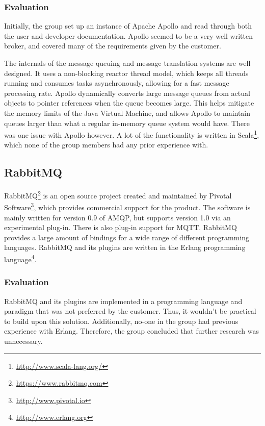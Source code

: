 \subsubsection{Evaluation}
\label{subsec:prestudies-existing_solutions-apache_apollo-evaluation}

Initially, the group set up an instance of Apache Apollo and read through both the user and developer documentation. Apollo seemed to be a very well written broker, and covered many of the requirements given by the customer.

The internals of the message queuing and message translation systems are well designed. It uses a non-blocking reactor thread model, which keeps all threads running and consumes tasks asynchronously, allowing for a fast message processing rate. Apollo dynamically converts large message queues from actual objects to pointer references when the queue becomes large. This helps mitigate the memory limits of the Java Virtual Machine, and allows Apollo to maintain queues larger than what a regular in-memory queue system would have. There was one issue with Apollo however. A lot of the functionality is written in Scala\footnote{\url{http://www.scala-lang.org/}}, which none of the group members had any prior experience with.

\subsection{RabbitMQ}
\label{subsec:prestudies-existing_solutions-rabbitmq}

RabbitMQ\footnote{\url{https://www.rabbitmq.com}} is an open source project created and maintained by Pivotal Software\footnote{\url{http://www.pivotal.io}}, which provides commercial support for the product. The software is mainly written for version 0.9 of AMQP, but supports version 1.0 via an experimental plug-in. There is also plug-in support for MQTT. RabbitMQ provides a large amount of bindings for a wide range of different programming languages. RabbitMQ and its plugins are written in the Erlang programming language\footnote{\url{http://www.erlang.org}}.

\subsubsection{Evaluation}
\label{subsec:prestudies-existing_solutions-rabbitmq-evaluation}

RabbitMQ and its plugins are implemented in a programming language and paradigm that was not preferred by the customer. Thus, it wouldn't be practical to build upon this solution. Additionally, no-one in the group had previous experience with Erlang. Therefore, the group concluded that further research was unnecessary.

